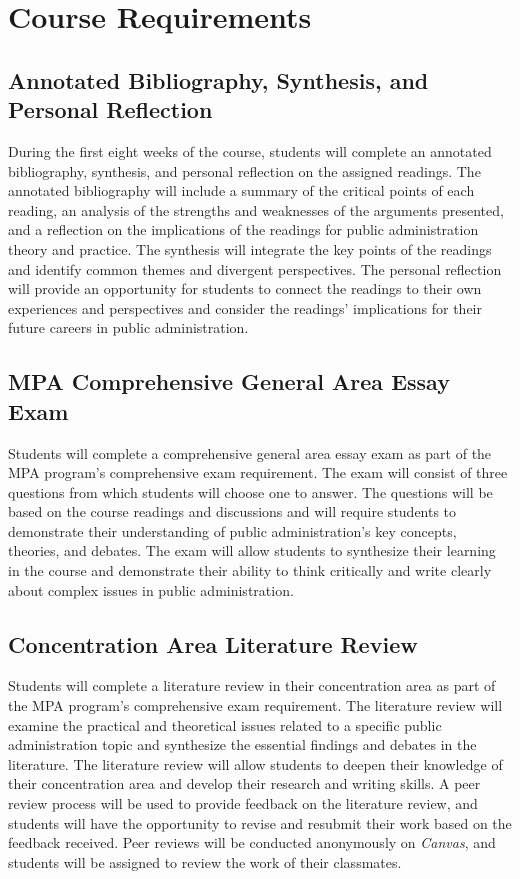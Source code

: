 \documentclass[12pt, letterpaper]{article}
\begin{document}
\section{Course Requirements}

\subsection*{Annotated Bibliography, Synthesis, and Personal Reflection}
During the first eight weeks of the course, students will complete an annotated bibliography, synthesis, and personal reflection on the assigned readings. The annotated bibliography will include a summary of the critical points of each reading, an analysis of the strengths and weaknesses of the arguments presented, and a reflection on the implications of the readings for public administration theory and practice. The synthesis will integrate the key points of the readings and identify common themes and divergent perspectives. The personal reflection will provide an opportunity for students to connect the readings to their own experiences and perspectives and consider the readings' implications for their future careers in public administration.

\subsection*{MPA Comprehensive General Area Essay Exam}

Students will complete a comprehensive general area essay exam as part of the MPA program’s comprehensive exam requirement. The exam will consist of three questions from which students will choose one to answer. The questions will be based on the course readings and discussions and will require students to demonstrate their understanding of public administration's key concepts, theories, and debates. The exam will allow students to synthesize their learning in the course and demonstrate their ability to think critically and write clearly about complex issues in public administration.

\subsection*{Concentration Area Literature Review}

Students will complete a literature review in their concentration area as part of the MPA program’s comprehensive exam requirement. The literature review will examine the practical and theoretical issues related to a specific public administration topic and synthesize the essential findings and debates in the literature. The literature review will allow students to deepen their knowledge of their concentration area and develop their research and writing skills. A peer review process will be used to provide feedback on the literature review, and students will have the opportunity to revise and resubmit their work based on the feedback received. Peer reviews will be conducted anonymously on \emph{Canvas}, and students will be assigned to review the work of their classmates.
\end{document}

